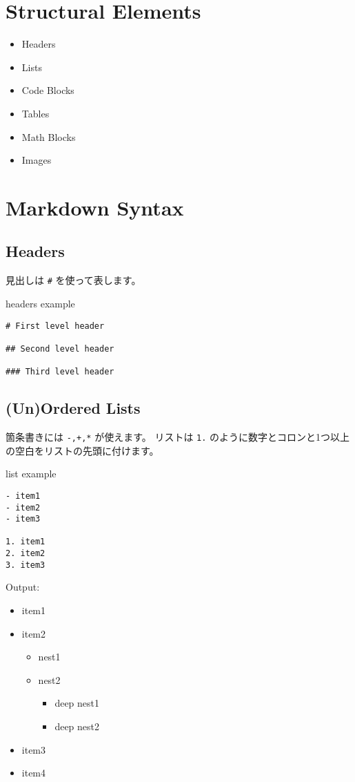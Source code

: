 \documentclass[a4j, titlepage]{jarticle}
\begin{document}
\section{Structural Elements}

\begin{itemize}
\item Headers
\item Lists
\item Code Blocks
\item Tables
\item Math Blocks
\item Images
\end{itemize}

\section{Markdown Syntax}

\subsection{Headers}

見出しは {\tt \#} を使って表します。

\begin{itembox}[c]{headers example}
\begin{verbatim}
# First level header

## Second level header

### Third level header
\end{verbatim}
\end{itembox}

\subsection{(Un)Ordered Lists}

箇条書きには {\tt -,+,*} が使えます。
リストは {\tt 1.} のように数字とコロンと1つ以上の空白をリストの先頭に付けます。

\begin{itembox}[c]{list example}
\begin{verbatim}
- item1
- item2
- item3

1. item1
2. item2
3. item3
\end{verbatim}
\end{itembox}

Output:

\begin{itemize}
\item item1
\item item2


\begin{itemize}
\item nest1
\item nest2


\begin{itemize}
\item deep nest1
\item deep nest2
\end{itemize}
\end{itemize}
\item item3
\item item4
\end{itemize}
\end{document}
